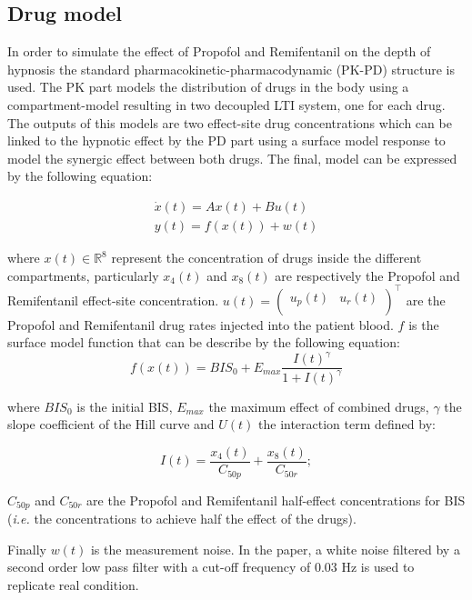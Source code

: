 \subsection{Drug model}
In order to simulate the effect of Propofol and Remifentanil on the depth of hypnosis the standard pharmacokinetic-pharmacodynamic (PK-PD) structure is used. The PK part models the distribution of drugs in the body using a compartment-model resulting in two decoupled LTI system, one for each drug. The outputs of this models are two effect-site drug concentrations which can be linked to the hypnotic effect by the PD part using a surface model response to model the synergic effect between both drugs. The final, model can be expressed by the following equation:

\begin{equation}
\begin{array}{ll}
        \dot{x}(t) = A x(t) + B u(t)\\
        y(t) = f(x(t)) + w(t)
    \end{array}
\label{eq:model}
\end{equation}

where $x(t) \in \mathbb{R} ^8$ represent the concentration of drugs inside the different compartments, particularly $x_4(t)$ and $x_8(t)$ are respectively the Propofol and Remifentanil effect-site concentration. $u(t)=\begin{pmatrix}
u_p(t) & u_r(t) \\
\end{pmatrix}^\top$ are the Propofol and Remifentanil drug rates injected into the patient blood. $f$ is the surface model function that can be describe by the following equation:
\begin{equation}
	f(x(t)) = BIS_0 + E_{max} \frac{I(t)^\gamma}{1 + I(t)^\gamma}
\end{equation}

where $BIS_0$ is the initial BIS, $E_{max}$ the maximum effect of combined drugs, $\gamma$ the slope coefficient of the Hill curve and $U(t)$ the interaction term defined by:

\begin{equation}
I(t) = \frac{x_{4}(t)}{C_{50p}} + \frac{x_{8}(t)}{C_{50r}}; 
\end{equation}

$C_{50p}$ and $C_{50r}$ are the Propofol and Remifentanil half-effect concentrations for BIS ({\em i.e.} the concentrations to achieve half the effect of the drugs).

Finally $w(t)$ is the measurement noise. In the paper, a white noise filtered by a second order low pass filter with a cut-off frequency of 0.03 Hz is used to replicate real condition.
\medskip

